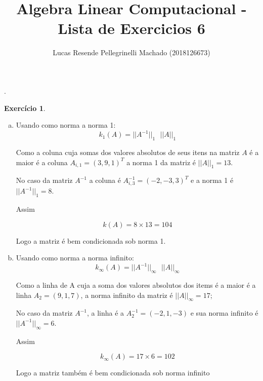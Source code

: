 \documentclass[11pt]{article}
\begin{document}
  {}%
  {}%
  {}%
  {}%
  {\bfseries}%
  {.}%
  {\newline}%
  {}%

\theoremstyle{definition}
\theoremstyle{break}
\newtheorem{exerc}{Exercício}

\author{Lucas Resende Pellegrinelli Machado (2018126673)}
\title{Algebra Linear Computacional - Lista de Exercicios 6}
\maketitle

\medskip

\begin{exerc}
\begin{enumerate}[a.]
\
Visto que o número de condição de uma matriz a ($k(A)$) é dado por

$$k(A) = ||A^{-1}|| \text{ } ||A||$$

\item
Usando como norma a norma 1:
$$k_1(A) = ||A^{-1}||_1 \text{ } ||A||_1$$

Como a coluna cuja somas dos valores absolutos de seus itens na matriz $A$ é a maior é a coluna $A_{i, 1} = (3, 9, 1)^T$ a norma 1 da matriz é $||A||_1 = 13$.

No caso da matriz $A^{-1}$ a coluna é $A^{-1}_{i, 3} = (-2, -3, 3)^T$ e a norma 1 é $||A^{-1}||_1 = 8$.

Assim

$$k(A) = 8 \times 13 = 104$$

Logo a matriz é bem condicionada sob norma 1.

\item
Usando como norma a norma infinito:
$$k_\infty(A) = ||A^{-1}||_\infty \text{ } ||A||_\infty$$

Como a linha de A cuja a soma dos valores absolutos dos items é a maior é a linha $A_2 = (9, 1, 7)$, a norma infinito da matriz é $||A||_\infty = 17$;

No caso da matriz $A^{-1}$, a linha é a $A^{-1}_2 = (-2, 1, -3)$ e sua norma infinito é $||A^{-1}||_\infty = 6$.

Assim

$$k_\infty(A) = 17 \times 6 = 102$$

Logo a matriz também é bem condicionada sob norma infinito

\end{enumerate}
\end{exerc}
\end{document}
